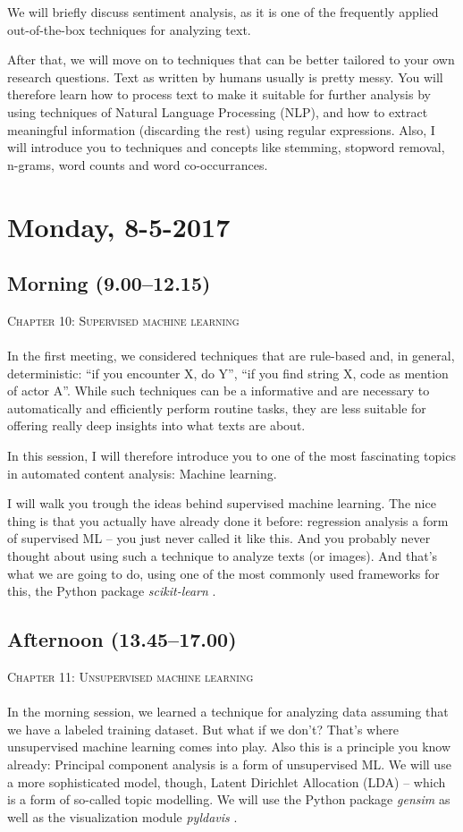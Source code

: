 \documentclass[a4paper,12pt]{report}
\begin{document}
We will briefly discuss sentiment analysis, as it is one of the frequently applied out-of-the-box techniques for analyzing text.

After that, we will move on to techniques that can be better tailored to your own research questions. Text as written by humans usually is pretty messy. You will therefore learn how to process text to make it suitable for further analysis by using techniques of Natural Language Processing (NLP), and how to extract meaningful information (discarding the rest) using regular expressions. Also, I will introduce you to techniques and concepts like stemming, stopword removal, n-grams, word counts and word co-occurrances.


\section*{Monday, 8-5-2017}
\subsection*{Morning (9.00--12.15)}
\textsc{ Chapter 10: Supervised machine learning}\\
~\\
In the first meeting, we considered techniques that are rule-based and, in general, deterministic: ``if you encounter X, do Y'', ``if you find string X, code as mention of actor A''. While such techniques can be a informative and are necessary to automatically and efficiently perform routine tasks, they are less suitable for offering really deep insights into what texts are about.

In this session, I will therefore introduce you to one of the most fascinating topics in automated content analysis: Machine learning. 

I will walk you trough the ideas behind supervised machine learning. The nice thing is that you actually have already done it before: regression analysis a form of supervised ML -- you just never called it like this. And you probably never thought about using such a technique to analyze texts (or images). And that's what we are going to do, using one of the most commonly used frameworks for this, the Python package \emph{scikit-learn} \citep{scikit-learn}.

\subsection*{Afternoon (13.45--17.00)}
\textsc{ Chapter 11: Unsupervised machine learning}\\
~\\
In the morning session, we learned a technique for analyzing data assuming that we have a labeled training dataset. But what if we don't? That's where unsupervised machine learning comes into play. Also this is a principle you know already: Principal component analysis is a form of unsupervised ML. We will use a more sophisticated model, though, Latent Dirichlet Allocation (LDA) -- which is a form of so-called topic modelling. We will use the Python package \emph{gensim} \citep{Rehurek2010} as well as the visualization module \emph{pyldavis} \citep{Sievert2014}.
\end{document}
